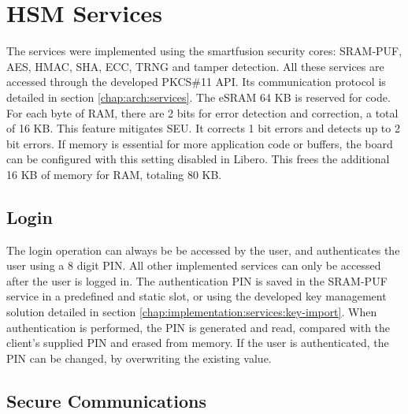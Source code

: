 \section{HSM Services}\label{chap:implementation:services}

The services were implemented using the smartfusion security cores: SRAM-PUF, AES, HMAC, SHA, ECC, TRNG and tamper detection.
All these services are accessed through the developed PKCS\#11 API. Its communication protocol is detailed in section \ref{chap:arch:services}.
The eSRAM 64 KB is reserved for code. For each byte of RAM, there are 2 bits for error detection and correction, a total of 16 KB. This feature mitigates \ac{SEU}. It corrects 1 bit errors and detects up to 2 bit errors. If memory is essential for more application code or buffers, the board can be configured with this setting disabled in Libero. This frees the additional 16 KB of memory for RAM, totaling 80 KB.

\subsection{Login}\label{chap:implementation:services:authentication}

The login operation can always be be accessed by the user, and authenticates the user using a 8 digit PIN. All other implemented services can only be accessed after the user is logged in.
The authentication PIN is saved in the SRAM-PUF service in a predefined and static slot, or using the developed key management solution detailed in section \ref{chap:implementation:services:key-import}. When authentication is performed, the PIN is generated and read, compared with the client's supplied PIN and erased from memory.
If the user is authenticated, the PIN can be changed, by overwriting the existing value.

\subsection{Secure Communications}\label{chap:implementation:services:secure}

